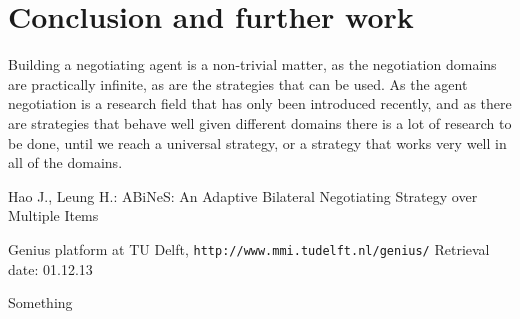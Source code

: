 \documentclass[html]{report}    %
\begin{document}
\section{Conclusion and further work}
Building a negotiating agent is a non-trivial matter, as the negotiation domains are practically infinite, as are the strategies that can be used. As the agent negotiation is a research field that has only been introduced recently, and as there are strategies that behave well given different domains there is a lot of research to be done, until we reach a universal strategy, or a strategy that works very well in all of the domains.

\begin{thebibliography}{}

Hao J., Leung H.:
ABiNeS: An Adaptive Bilateral Negotiating Strategy over Multiple Items

Genius platform at TU Delft,
\texttt{http://www.mmi.tudelft.nl/genius/} Retrieval date: 01.12.13

Something

\end{thebibliography}
\end{document}
